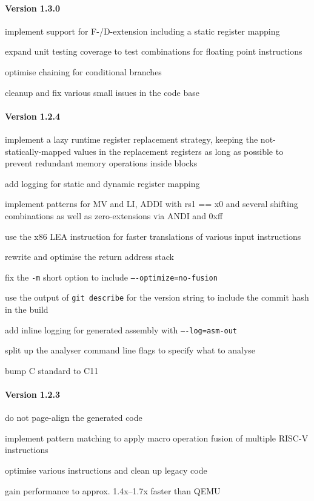 \paragraph{Version 1.3.0}
\begin{itemize*}
 	\item implement support for F-/D-extension including a static register mapping
 	\item expand unit testing coverage to test combinations for floating point instructions
 	\item optimise chaining for conditional branches
 	\item cleanup and fix various small issues in the code base
\end{itemize*}


\paragraph{Version 1.2.4}
\begin{itemize*}
 	\item implement a lazy runtime register replacement strategy, keeping the not-statically-mapped values in the replacement registers as long as possible to prevent redundant memory operations inside blocks
 	\item add logging for static and dynamic register mapping
 	\item implement patterns for MV and LI, ADDI with rs1 == x0 and several shifting combinations as well as zero-extensions via ANDI and 0xff
 	\item use the x86 LEA instruction for faster translations of various input instructions
 	\item rewrite and optimise the return address stack
 	\item fix the \texttt{-m} short option to include \texttt{----optimize=no-fusion}
 	\item use the output of \texttt{git describe} for the version string to include the commit hash in the build
 	\item add inline logging for generated assembly with \texttt{----log=asm-out}
 	\item split up the analyser command line flags to specify what to analyse
 	\item bump C standard to C11
\end{itemize*}


\paragraph{Version 1.2.3}
\begin{itemize*}
 	\item do not page-align the generated code
 	\item implement pattern matching to apply macro operation fusion of multiple RISC-V instructions
 	\item optimise various instructions and clean up legacy code
 	\item gain performance to approx. 1.4x--1.7x faster than QEMU
\end{itemize*}


